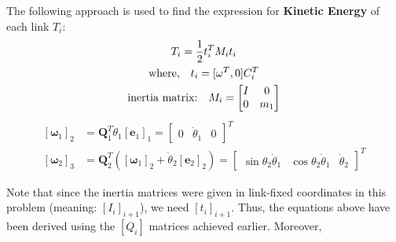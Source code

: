 \documentclass[conference]{IEEEtran}
\begin{document}
The following approach is used to find the expression for \textbf{Kinetic Energy} of each link \(T_i\):
\begin{gather}
    T_i = \frac{1}{2} t_i^T M_i t_i \\
    \text{\small where,} \quad t_i = [\omega^T, 0] C_i^T \\
    \text{\small inertia matrix:} \quad M_i = \begin{bmatrix}
        I & 0   \\
        0 & m_1
    \end{bmatrix}
\end{gather}
\begin{align*}
    \left[\boldsymbol{\omega}_1\right]_2 & = \mathbf{Q}_1^T \dot{\theta}_1\left[\mathbf{e}_1\right]_1=\left[\begin{array}{lll}
                                                                                                                    0 & \dot{\theta}_1 & 0
                                                                                                                \end{array}\right]^T                                                                                                        \\
    \left[\boldsymbol{\omega}_2\right]_3 & = \mathbf{Q}_2^T\left(\left[\boldsymbol{\omega}_1\right]_2+\dot{\theta}_2\left[\mathbf{e}_2\right]_2\right)=\left[\begin{array}{lll}
                                                                                                                                                                     \sin \theta_2 \dot{\theta}_1 & \cos \theta_2 \dot{\theta}_1 & \dot{\theta}_2
                                                                                                                                                                 \end{array}\right]^T
\end{align*}

Note that since the inertia matrices were given in link-fixed coordinates in this problem (meaning: $[I_i]_{i+1}$), we need $[t_i]_{i+1}$. Thus, the equations above have been derived using the $[Q_i]$ matrices achieved earlier. Moreover,
\end{document}
